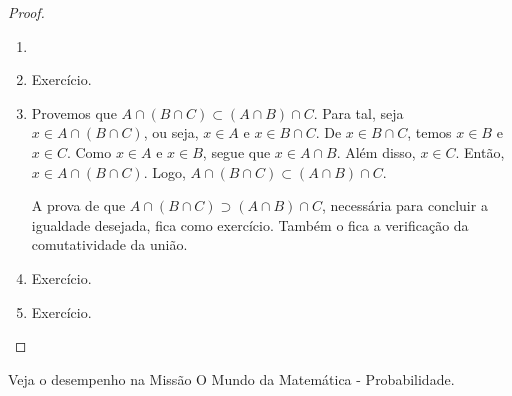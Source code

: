 \begin{proof}
\begin{enumerate}
	\item[]
	\item Exercício.
	\item Provemos que $A \cap (B \cap C) \subset (A \cap B) \cap C$. Para tal, seja $x \in A \cap (B \cap C)$, ou seja, $x \in A$ e $x \in B \cap C$. De $x \in B \cap C$, temos $x \in B$ e $x \in C$. Como $x \in A$ e $x \in B$, segue que $x \in A \cap B$. Além disso, $x \in C$. Então, $x \in A \cap (B \cap C)$. Logo, $A \cap (B \cap C) \subset (A \cap B) \cap C$. 

  A prova de que $A \cap (B \cap C) \supset (A \cap B) \cap C$, necessária para concluir a igualdade desejada, fica como exercício. Também o fica a verificação da comutatividade da união.
	\item Exercício.
	\item Exercício.
\end{enumerate}
\end{proof}

\begin{onlineact}
Veja o desempenho na Missão O Mundo da Matemática - Probabilidade.
\end{onlineact}


